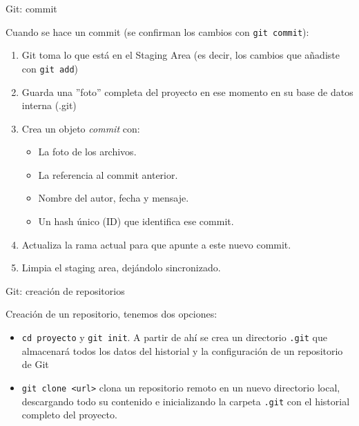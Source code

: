 \documentclass{beamer}
\begin{document}
\begin{frame}{Git: commit}

Cuando se hace un commit (se confirman los cambios con \texttt{git commit}):

\begin{enumerate}
    \item Git toma lo que está en el Staging Area (es decir, los cambios que añadiste con \texttt{git add})

    \item Guarda una ''foto'' completa del proyecto en ese momento en su base de datos interna (.git)

    \item  Crea un objeto \textit{commit} con:

    \begin{itemize}
        \item La foto de los archivos.
        \item La referencia al commit anterior.
        \item Nombre del autor, fecha y mensaje.
        \item Un hash único (ID) que identifica ese commit.
    \end{itemize}


    \item Actualiza la rama actual para que apunte a este nuevo commit.

    \item Limpia el staging area, dejándolo sincronizado.
\end{enumerate}
    
\end{frame}

\begin{frame}{Git: creación de repositorios}

Creación de un repositorio, tenemos dos opciones:

\begin{itemize}
    \item \texttt{cd proyecto} y \texttt{git init}. A partir de ahí se crea un directorio \texttt{.git} que almacenará todos los datos del historial y la configuración de un repositorio de Git
    \item \texttt{git clone <url>} clona un repositorio remoto en un nuevo directorio local, descargando todo su contenido e inicializando la carpeta \texttt{.git} con el historial completo del proyecto.
\end{itemize}
    
\end{frame}
\end{document}
